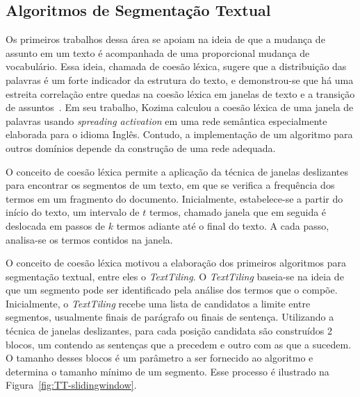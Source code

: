 
\subsection{Algoritmos de Segmentação Textual}


Os primeiros trabalhos dessa área se apoiam na ideia de que a mudança de assunto em um texto é acompanhada de uma proporcional mudança de vocabulário. Essa ideia, chamada de coesão léxica, sugere que a distribuição das palavras é um forte indicador da estrutura do texto, e demonstrou-se que há uma estreita correlação entre quedas na coesão léxica em janelas de texto e a transição de assuntos~\cite{Kozima1993}. Em seu trabalho, Kozima calculou a coesão léxica de uma janela de palavras usando \textit{spreading activation} em uma rede semântica especialmente elaborada para o idioma Inglês. Contudo, a implementação de um algoritmo para outros domínios depende da construção de uma rede adequada. 



O conceito de coesão léxica permite a aplicação da técnica de janelas deslizantes para encontrar os segmentos de um texto, em que se verifica a frequência dos termos em um fragmento do documento. Inicialmente, estabelece-se a partir do início do texto, um intervalo de $t$ termos, chamado janela que em seguida é deslocada em passos de $k$ termos adiante até o final do texto. A cada passo, analisa-se os termos contidos na janela.





O conceito de coesão léxica motivou a elaboração dos primeiros algoritmos para segmentação textual, entre eles o \textit{TextTiling}. O \textit{TextTiling} baseia-se na ideia de que um segmento pode ser identificado pela análise dos termos que o compõe. Inicialmente, o \textit{TextTiling} recebe uma lista de candidatos a limite entre segmentos, usualmente finais de parágrafo ou finais de sentença. Utilizando a técnica de janelas deslizantes, para cada posição candidata são construídos 2 blocos, um contendo as sentenças que a precedem e outro com as que a sucedem. O tamanho desses blocos é um parâmetro a ser fornecido ao algoritmo e determina o tamanho mínimo de um segmento. Esse processo é ilustrado na Figura~\ref{fig:TT-slidingwindow}.



